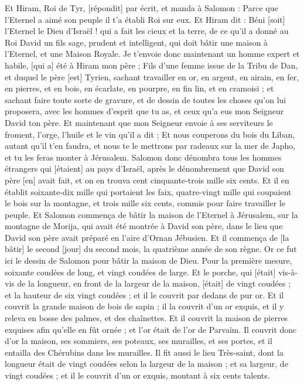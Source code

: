 \begin{multicols}{2}
Et Hiram, Roi de Tyr, [répondit] par écrit, et manda à Salomon : Parce que l'Eternel a aimé son peuple il t'a établi Roi sur eux.
Et Hiram dit : Béni [soit] l'Eternel le Dieu d'Israël ! qui a fait les cieux et la terre, de ce qu'il a donné au Roi David un fils sage, prudent et intelligent, qui doit bâtir une maison à l'Eternel, et une Maison Royale.
Je t'envoie donc maintenant un homme expert et habile, [qui a] été à Hiram mon père ;
Fils d'une femme issue de la Tribu de Dan, et duquel le père [est] Tyrien, sachant travailler en or, en argent, en airain, en fer, en pierres, et en bois, en écarlate, en pourpre, en fin lin, et en cramoisi ; et sachant faire toute sorte de gravure, et de dessin de toutes les choses qu'on lui proposera, avec les hommes d'esprit que tu as, et ceux qu'a eus mon Seigneur David ton père.
Et maintenant que mon Seigneur envoie à ses serviteurs le froment, l'orge, l'huile et le vin qu'il a dit ;
Et nous couperons du bois du Liban, autant qu'il t'en faudra, et nous te le mettrons par radeaux sur la mer de Japho, et tu les feras monter à Jérusalem.
Salomon donc dénombra tous les hommes étrangers qui [étaient] au pays d'Israël, après le dénombrement que David son père [en] avait fait, et on en trouva cent cinquante-trois mille six cents.
Et il en établit soixante-dix mille qui portaient les faix, quatre-vingt mille qui coupaient le bois sur la montagne, et trois mille six cents, commis pour faire travailler le peuple.
\VerseOne{}Et Salomon commença de bâtir la maison de l'Eternel à Jérusalem, sur la montagne de Morija, qui avait été montrée à David son père, dans le lieu que David son père avait préparé en l'aire d'Ornan Jébusien.
Et il commença de [la bâtir] le second [jour] du second mois, la quatrième année de son règne.
Or ce fut ici le dessin de Salomon pour bâtir la maison de Dieu. Pour la première mesure, soixante coudées de long, et vingt coudées de large.
Et le porche, qui [était] vis-à-vis de la longueur, en front de la largeur de la maison, [était] de vingt coudées ; et la hauteur de six vingt coudées ; et il le couvrit par dedans de pur or.
Et il couvrit la grande maison de bois de sapin ; il la couvrit d'un or exquis, et il y releva en bosse des palmes, et des chaînettes.
Et il couvrit la maison de pierres exquises afin qu'elle en fût ornée ; et l'or était de l'or de Parvaïm.
Il couvrit donc d'or la maison, ses sommiers, ses poteaux, ses murailles, et ses portes, et il entailla des Chérubins dans les murailles.
Il fit aussi le lieu Très-saint, dont la longueur était de vingt coudées selon la largeur de la maison ; et sa largeur, de vingt coudées ; et il le couvrit d'un or exquis, montant à six cents talents.

\end{multicols}
